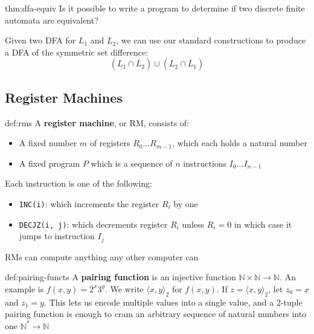 \documentclass[landscape, 8pt]{extarticle}
\begin{document}
\begin{multicols}{3}
\begin{thm}{thm:dfa-equiv}{}
Is it possible to write a program to determine if two discrete finite automata are equivalent?

Given two DFA for $L_1$ and $L_2$, we can use our standard constructions to produce a DFA of the symmetric set difference:
\[(L_1 \cap \overline L_2) \cup (L_2 \cap \overline L_1)\]
\end{thm}


\newpage

\subsection*{Register Machines}

\begin{dfn}{def:rms}{}
A \textbf{register machine}, or RM, consists of:
\renewcommand\labelitemi{\tiny$\bullet$}
\begin{itemize}
    \setlength\itemsep{0em}
    \item A fixed number $m$ of registers $R_{0}\dots R_{m-1}$, which each holds a natural number
    \item A fixed program $P$ which is a sequence of $n$ instructions $I_{0} \dots I_{n-1}$
\end{itemize}
Each instruction is one of the following:
\renewcommand\labelitemi{\tiny$\bullet$}
\begin{itemize}
    \setlength\itemsep{0em}
    \item \texttt{INC(i)}: which increments the register $R_i$ by one
    \item \texttt{DECJZ(i, j)}: which decrements register $R_i$ unless $R_i = 0$ in which case it jumps to instruction $I_j$
\end{itemize}
RMs can compute anything any other computer can
\end{dfn}


\begin{dfn}{def:pairing-functs}{}
A \textbf{pairing function} is an injective function $\mathbb{N} \times \mathbb{N} \to \mathbb{N}$. An example is $f(x,y) = 2^{x}3^{y}$.
\newline
We write $\langle x,y\rangle_{2}$ for $f(x,y)$. If $z = \langle x,y\rangle_{2}$, let $z_{0} = x$ and $z_{1} = y$.
This lets us encode multiple values into a single value, and a 2-tuple pairing function is enough to cram an arbitrary sequence of natural numbers into one $\mathbb{N}^{*}\to \mathbb{N}$
\end{dfn}


\end{multicols}
\end{document}
